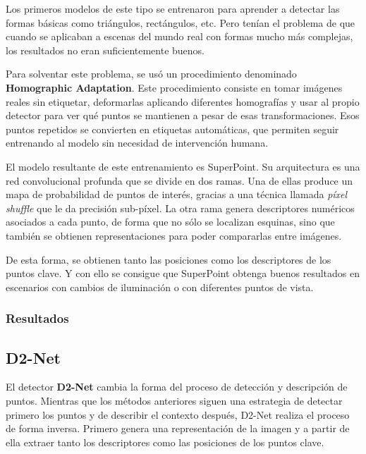 Los primeros modelos de este tipo se entrenaron para aprender a detectar las formas básicas como triángulos, rectángulos, etc. Pero tenían el problema de que cuando se aplicaban a escenas del mundo real con formas mucho más complejas, los resultados no eran suficientemente buenos.  

Para solventar este problema, se usó un procedimiento denominado \textbf{Homographic Adaptation}. Este procedimiento consiste en tomar imágenes reales sin etiquetar, deformarlas aplicando diferentes homografías y usar al propio detector para ver qué puntos se mantienen a pesar de esas transformaciones. Esos puntos repetidos se convierten en etiquetas automáticas, que permiten seguir entrenando al modelo sin necesidad de intervención humana.  

El modelo resultante de este entrenamiento es SuperPoint. Su arquitectura es una red convolucional profunda que se divide en dos ramas. Una de ellas produce un mapa de probabilidad de puntos de interés, gracias a una técnica llamada \emph{píxel shuffle} que le da precisión sub-píxel. La otra rama genera descriptores numéricos asociados a cada punto, de forma que no sólo se localizan esquinas, sino que también se obtienen representaciones para poder compararlas entre imágenes.  

De esta forma, se obtienen tanto las posiciones como los descriptores de los puntos clave. Y con ello se consigue que SuperPoint obtenga buenos resultados en escenarios con cambios de iluminación o con diferentes puntos de vista.


\subsubsection{Resultados}


\subsection{D2-Net}

El detector \textbf{D2-Net} \cite{dusmanu2019d2net} cambia la forma del proceso de detección y descripción de puntos. Mientras que los métodos anteriores siguen una estrategia de detectar primero los puntos y de describir el contexto después, D2-Net realiza el proceso de forma inversa. Primero genera una representación de la imagen y a partir de ella extraer tanto los descriptores como las posiciones de los puntos clave.

